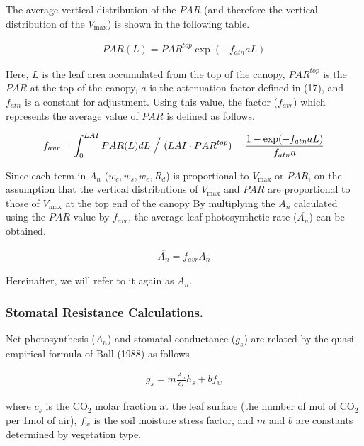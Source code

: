 The average vertical distribution of the \(PAR\) (and therefore the
vertical distribution of the \(V_{\max}\)) is shown in the following
table.

\begin{eqnarray}
 PAR(L) = PAR^{top} \exp(- f_{atn} a L)
\end{eqnarray}

Here, \(L\) is the leaf area accumulated from the top of the canopy,
\(PAR^{top}\) is the \(PAR\) at the top of the canopy, \(a\) is the
attenuation factor defined in (17), and \(f_{atn}\) is a constant for
adjustment. Using this value, the factor (\(f_{avr}\)) which represents
the average value of \(PAR\) is defined as follows.

\begin{eqnarray}
 f_{avr} = \int_0^{LAI} PAR(L) dL \Bigm / (LAI \cdot PAR^{top})
 = \frac{1 - \exp(- f_{atn} a L)}{f_{atn} a}
\end{eqnarray}

Since each term in \(A_n\) (\(w_c, w_s, w_e, R_d\)) is proportional to
\(V_{\max}\) or \(PAR\), on the assumption that the vertical
distributions of \(V_{\max}\) and \(PAR\) are proportional to those of
\(V_{\max}\) at the top end of the canopy By multiplying the \(A_n\)
calculated using the \(PAR\) value by \(f_{avr}\), the average leaf
photosynthetic rate (\(\overline{A_n}\)) can be obtained.

\begin{eqnarray}
 \overline{A_n} = f_{avr} A_n
\end{eqnarray}

Hereinafter, we will refer to it again as \(A_n\).

\hypertarget{stomatal-resistance-calculations.}{%
\subsubsection{Stomatal Resistance
Calculations.}\label{stomatal-resistance-calculations.}}

Net photosynthesis (\(A_n\)) and stomatal conductance (\(g_s\)) are
related by the quasi-empirical formula of Ball (1988) as follows

\begin{eqnarray}
 g_s = m \frac {A_n}{c_s} h_s + b f_w
\end{eqnarray}

where \(c_s\) is the CO\(_2\) molar fraction at the leaf surface (the
number of mol of CO\(_2\) per 1mol of air), \(f_w\) is the soil moisture
stress factor, and \(m\) and \(b\) are constants determined by
vegetation type.

